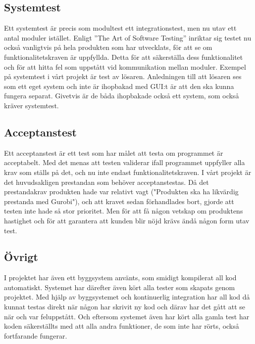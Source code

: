 \subsection{Systemtest}	
	Ett systemtest är precis som modultest ett integrationstest, men nu utav ett antal moduler istället. Enligt ''The Art of Software Testing'' inriktar sig testet nu också vanligtvis på hela produkten som har utvecklats, för att se om funktionalitetskraven är uppfyllda. Detta för att säkerställa dess funktionalitet och för att hitta fel som uppstått vid kommunikation mellan moduler. Exempel på systemtest i vårt projekt är test av lösaren. Anledningen till att lösaren ses som ett eget system och inte är ihopbakad med GUI:t är att den ska kunna fungera separat. Givetvis är de båda ihopbakade också ett system, som också kräver systemtest.	
\subsection{Acceptanstest}	
	Ett acceptanstest är ett test som har målet att testa om programmet är acceptabelt. Med det menas att testen validerar ifall programmet uppfyller alla krav som ställs på det, och nu inte endast funktionalitetskraven. I vårt projekt är det huvudsakligen prestandan som behöver acceptanstestas. Då det prestandakrav produkten hade var relativt vagt ("Produkten ska ha likvärdig prestanda med Gurobi"), och att kravet sedan förhandlades bort, gjorde att testen inte hade så stor prioritet. Men för att få någon vetskap om produktens hastighet och för att garantera att kunden blir nöjd krävs ändå någon form utav test.
\subsection{Övrigt}	
	I projektet har även ett byggsystem använts, som smidigt kompilerat all kod automatiskt. Systemet har därefter även kört alla tester som skapats genom projektet.
	Med hjälp av byggsystemet och kontinuerlig integration har all kod då kunnat testas direkt när någon har skrivit ny kod och därav har det gått att se när och var feluppstått. Och eftersom systemet även har kört alla gamla test har koden säkerställts med att alla andra funktioner, de som inte har rörts, också fortfarande fungerar.